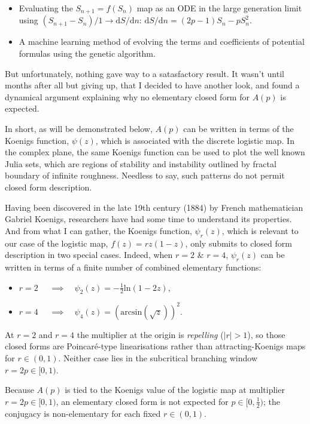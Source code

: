 \documentclass[11pt]{article}
\begin{document}
\begin{itemize}
    \item Evaluating the $S_{n+1} = f(S_n)$ map as an ODE in the large generation limit using $(S_{n+1} - S_n)/1 \to \mathrm{d}S / \mathrm{d} n$: $\mathrm{d}S / \mathrm{d} n = (2p-1)S_n - pS_{n}^2$.
    \item A machine learning method of evolving the terms and coefficients of potential formulas using the genetic algorithm.
\end{itemize}
But unfortunately, nothing gave way to a satasfactory result. It wasn't until months after all but giving up, that I decided to have another look, and found a dynamical argument explaining why no elementary closed form for $A(p)$ is expected.

In short, as will be demonstrated below, $A(p)$ can be written in terms of the Koenigs function, $\psi(z)$, which is associated with the discrete logistic map. In the complex plane, the same Koenigs function can be used to plot the well known Julia sets, 
which are regions of stability and instability outlined by fractal boundary of infinite roughness. Needless to say, such patterns do not permit closed form description.

Having been discovered in the late 19th century (1884) by French mathematician Gabriel Koenigs, researchers have had some time to understand its properties. And from what I can gather, the Koenigs function, $\psi_r(z)$, which is relevant to our case of the logistic map, $f(z) = rz(1-z)$, only submits to closed form description in two special cases. Indeed, when $r=2$ \& $r = 4$, $\psi_r(z)$
can be written in terms of a finite number of combined elementary functions: 

\begin{itemize}
    \item $r=2\quad$ $\implies \quad \psi_2(z) = -\frac{1}{2} \mathrm{ln}(1-2z)$,
    \item $r=4\quad$ $\implies \quad \psi_4(z) = \left(\mathrm{arcsin}\left(\sqrt{z}\right) \right)^2$.
\end{itemize}
At $r=2$ and $r=4$ the multiplier at the origin is \emph{repelling} ($|r|>1$), so those closed forms are Poincar\'e-type linearisations rather than attracting-Koenigs maps for $r\in(0,1)$. Neither case lies in the subcritical branching window $r=2p\in[0,1)$.

Because $A(p)$ is tied to the Koenigs value of the logistic map at multiplier $r=2p\in[0,1)$, an elementary closed form is not expected for $p\in[0,\tfrac12)$; the conjugacy is non-elementary for each fixed $r\in(0,1)$.
\end{document}
